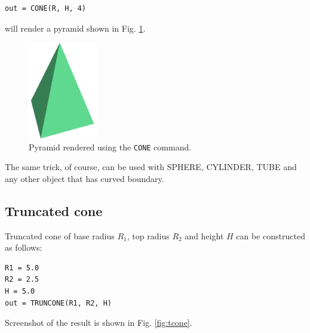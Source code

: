 \begin{bbox}
\begin{verbatim}
out = CONE(R, H, 4)
\end{verbatim}
\end{bbox}
\vspace{6mm}

\noindent
will render a pyramid shown in Fig. \ref{fig:cone-4}.

\begin{figure}[!ht]
\begin{center}
\includegraphics[width=0.27\textwidth]{img/cone-4.png}
\end{center}
\vspace{-4mm}
\caption{Pyramid rendered using the {\tt CONE} command.}
\label{fig:cone-4}
\end{figure}
\noindent
The same trick, of course, can be used with SPHERE, CYLINDER, TUBE and any 
other object that has curved boundary.

\subsection{Truncated cone}

Truncated cone of base radius $R_1$, top radius $R_2$ and height $H$
can be constructed as follows:\\

\begin{bbox}
\begin{verbatim}
R1 = 5.0
R2 = 2.5
H = 5.0
out = TRUNCONE(R1, R2, H)
\end{verbatim}
\end{bbox}
\vspace{6mm}

\noindent
Screenshot of the result is shown in Fig. \ref{fig:tcone}.

